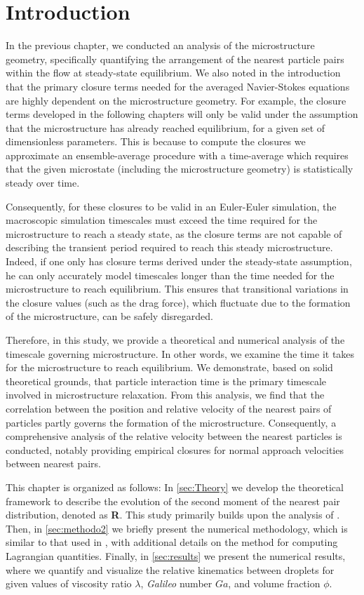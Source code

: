 \section{Introduction}

In the previous chapter, we conducted an analysis of the microstructure geometry, specifically quantifying the arrangement of the nearest particle pairs within the flow at steady-state equilibrium. 
We also noted in the introduction that the primary closure terms needed for the averaged Navier-Stokes equations are highly dependent on the microstructure geometry. 
For example, the closure terms developed in the following chapters will only be valid under the assumption that the microstructure has already reached equilibrium, for a given set of dimensionless parameters.
This is because to compute the closures we approximate an ensemble-average procedure with a time-average which requires that the given microstate (including the microstructure geometry) is statistically steady over time. 

Consequently, for these closures to be valid in an Euler-Euler simulation, the macroscopic simulation timescales must exceed the time required for the microstructure to reach a steady state, as the closure terms are not capable of describing the transient period required to reach this steady microstructure. 
Indeed, if one only has closure terms derived under the steady-state assumption, he can only accurately model timescales longer than the time needed for the microstructure to reach equilibrium. 
This ensures that transitional variations in the closure values (such as the drag force), which fluctuate due to the formation of the microstructure, can be safely disregarded.


Therefore, in this study, we provide a theoretical and numerical analysis of the timescale governing microstructure. 
In other words, we examine the time it takes for the microstructure to reach equilibrium. 
We demonstrate, based on solid theoretical grounds, that particle interaction time is the primary timescale involved in microstructure relaxation. 
From this analysis, we find that the correlation between the position and relative velocity of the nearest pairs of particles partly governs the formation of the microstructure. 
Consequently, a comprehensive analysis of the relative velocity between the nearest particles is conducted, notably providing empirical closures for normal approach velocities between nearest pairs. 

This chapter is organized as follows: 
In \ref{sec:Theory} we develop the theoretical framework to describe the evolution of the second moment of the nearest pair distribution, denoted as \textbf{R}.
This study primarily builds upon the analysis of \citet{zhang2023evolution}. 
Then, in \ref{sec:methodo2} we briefly present the numerical methodology, which is similar to that used in \citet{fintzi2024buoyancy}, with additional details on the method for computing Lagrangian quantities. 
Finally, in \ref{sec:results} we present the numerical results, where we quantify and visualize the relative kinematics between droplets for given values of viscosity ratio $\lambda$, \textit{Galileo} number $Ga$, and volume fraction $\phi$.

